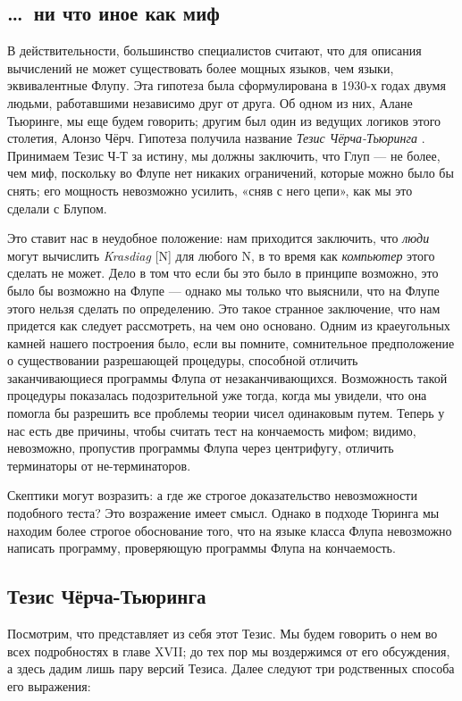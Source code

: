 \documentclass[../main.tex]{subfiles}
\begin{document}
\subsection{\ldots~ни что иное как миф}

В действительности, большинство специалистов считают, что для описания вычислений не может существовать более мощных языков, чем языки, эквивалентные Флупу. Эта гипотеза была сформулирована в 1930-х годах двумя людьми, работавшими независимо друг от друга. Об одном из них, Алане Тьюринге, мы еще будем говорить; другим был один из ведущих логиков этого столетия, Алонзо Чёрч. Гипотеза получила название \emph{Тезис Чёрча-Тьюринга} . Принимаем Тезис Ч-Т за истину, мы должны заключить, что Глуп --- не более, чем миф, поскольку во Флупе нет никаких ограничений, которые можно было бы снять; его мощность невозможно усилить, «сняв с него цепи», как мы это сделали с Блупом.

Это ставит нас в неудобное положение: нам приходится заключить, что \emph{люди} могут вычислить \emph{Krasdiag} {[}N{]} для любого N, в то время как \emph{компьютер} этого сделать не может. Дело в том что если бы это было в принципе возможно, это было бы возможно на Флупе --- однако мы только что выяснили, что на Флупе этого нельзя сделать по определению. Это такое странное заключение, что нам придется как следует рассмотреть, на чем оно основано. Одним из краеугольных камней нашего построения было, если вы помните, сомнительное предположение о существовании разрешающей процедуры, способной отличить заканчивающиеся программы Флупа от незаканчивающихся. Возможность такой процедуры показалась подозрительной уже тогда, когда мы увидели, что она помогла бы разрешить все проблемы теории чисел одинаковым путем. Теперь у нас есть две причины, чтобы считать тест на кончаемость мифом; видимо, невозможно, пропустив программы Флупа через центрифугу, отличить терминаторы от не-терминаторов.

Скептики могут возразить: а где же строгое доказательство невозможности подобного теста? Это возражение имеет смысл. Однако в подходе Тюринга мы находим более строгое обоснование того, что на языке класса Флупа невозможно написать программу, проверяющую программы Флупа на кончаемость.


\subsection{Тезис Чёрча-Тьюринга}

Посмотрим, что представляет из себя этот Тезис. Мы будем говорить о нем во всех подробностях в главе XVII; до тех пор мы воздержимся от его обсуждения, а здесь дадим лишь пару версий Тезиса. Далее следуют три родственных способа его выражения:
\end{document}
